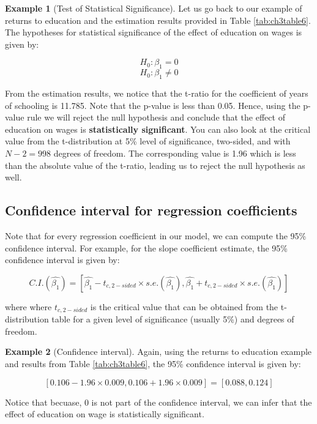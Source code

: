 \documentclass[
]{book}
\theoremstyle{definition}
\theoremstyle{definition}
\newtheorem{example}{Example}[chapter]
\theoremstyle{definition}
\theoremstyle{definition}
\theoremstyle{remark}
\begin{document}
\begin{example}[Test of Statistical Significance]
\protect\hypertarget{exm:unnamed-chunk-13}{}\label{exm:unnamed-chunk-13}Let us go back to our example of returns to education and the estimation results provided in Table \ref{tab:ch3table6}. The hypotheses for statistical significance of the effect of education on wages is given by:

\[H_0: \beta_1= 0\]
\[H_0: \beta_1\neq 0\]

From the estimation results, we notice that the t-ratio for the coefficient of years of schooling is 11.785. Note that the p-value is less than 0.05. Hence, using the p-value rule we will reject the null hypothesis and conclude that the effect of education on wages is \textbf{statistically significant}. You can also look at the critical value from the t-distribution at 5\% level of significance, two-sided, and with \(N-2=998\) degrees of freedom. The corresponding value is 1.96 which is less than the absolute value of the t-ratio, leading us to reject the null hypothesis as well.
\end{example}

\hypertarget{confidence-interval-for-regression-coefficients}{%
\subsection{Confidence interval for regression coefficients}\label{confidence-interval-for-regression-coefficients}}

Note that for every regression coefficient in our model, we can compute the 95\% confidence interval. For example, for the slope coefficient estimate, the 95\% confidence interval is given by:

\[C.I.(\hat{\beta_1}) =   \left[\hat{\beta_1}-t_{c,2-sided} \times s.e.(\hat{\beta_1}),\hat{\beta_1}+t_{c,2-sided} \times s.e.(\hat{\beta_1}) \right]\]

where where \(t_{c,2-sided}\) is the critical value that can be obtained from the t-distribution table for a given level of significance (usually 5\%) and degrees of freedom.

\begin{example}[Confidence interval]
\protect\hypertarget{exm:unnamed-chunk-14}{}\label{exm:unnamed-chunk-14}Again, using the returns to education example and results from Table \ref{tab:ch3table6}, the 95\% confidence interval is given by:

\[[0.106-1.96\times 0.009, 0.106+1.96\times 0.009]=[0.088,0.124]\]

Notice that becuase, \(0\) is not part of the confidence interval, we can infer that the effect of education on wage is statistically significant.
\end{example}
\end{document}
